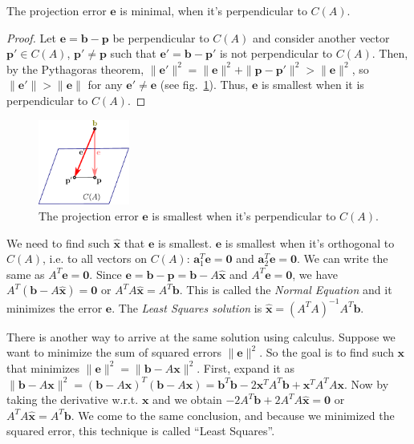 \documentclass{acm_proc_article-sp}
\begin{document}
\begin{prop}
The projection error \(\mathbf e\) is minimal, when it's perpendicular to \(C(A)\).
\end{prop}

\begin{proof}
Let \(\mathbf e = \mathbf b - \mathbf p\) be perpendicular to $C(A)$ and consider another vector \(\mathbf p' \in C(A)\), \(\mathbf p' \ne \mathbf p\) such that
\(\mathbf e' = \mathbf b - \mathbf p'\) is not perpendicular to
\(C(A)\). Then, by the Pythagoras theorem, \(\| \mathbf e' \|^2 = \| \mathbf e \|^2 + \| \mathbf p - \mathbf p' \|^2 > \| \mathbf e \|^2\), so \(\| \mathbf e' \| > \| \mathbf e \|\) for any
\(\mathbf e' \ne \mathbf e\) (see fig.~\ref{fig:smallest-error}). Thus, \(\mathbf e\) is smallest when it is perpendicular to $C(A)$.
\end{proof}


\begin{figure}%
\centering
\includegraphics[width=3cm]{smallest-error.pdf}
\caption{The projection error \(\mathbf e\) is smallest when it's perpendicular to \(C(A)\).}
\label{fig:smallest-error}
\end{figure}

We need to find such \(\hat {\mathbf x}\) that \(\mathbf e\) is smallest. $\mathbf e$ is smallest when it's orthogonal to \(C(A)\), i.e. to all vectors on \(C(A)\): \(\mathbf a_1^T \mathbf e = \mathbf 0\) and \(\mathbf a_2^T \mathbf e = \mathbf 0\).  We can write the same as \(A^T \mathbf e = \mathbf 0\). Since \(\mathbf e = \mathbf b - \mathbf p = \mathbf b - A \hat {\mathbf x}\) and \(A^T \mathbf e = \mathbf 0\), we have \(A^T (\mathbf b - A \hat {\mathbf x}) = \mathbf 0\) or \(A^T A \hat {\mathbf x} = A^T \mathbf b\). This is called the \emph{Normal Equation} and it minimizes the error \(\mathbf e\). The \emph{Least Squares solution} is \(\hat {\mathbf x} = (A^T A)^{-1} A^T \mathbf b\).

There is another way to arrive at the same solution using calculus. Suppose we want to minimize the sum of squared errors \(\| \mathbf e \|^2\). So the goal is to find such \(\mathbf x\)
that minimizes \(\| \mathbf e \|^2 = \| \mathbf b - A \mathbf x \|^2\). First, expand it as
\(\| \mathbf b - A \mathbf x \|^2 = ( \mathbf b - A \mathbf x )^T ( \mathbf b - A \mathbf x ) = \mathbf b^T \mathbf b - 2 \mathbf x^T A^T \mathbf b + \mathbf x^T A^T A \mathbf x\).
Now by taking the derivative w.r.t. \(\mathbf x\) and we obtain
\(- 2 A^T \mathbf b + 2 A^T A \hat {\mathbf x} = \mathbf 0\) or \(A^T A \hat {\mathbf x} = A^T \mathbf b\). We come to the same conclusion, and because we minimized the squared error, this technique is called ``Least Squares''.
\end{document}
